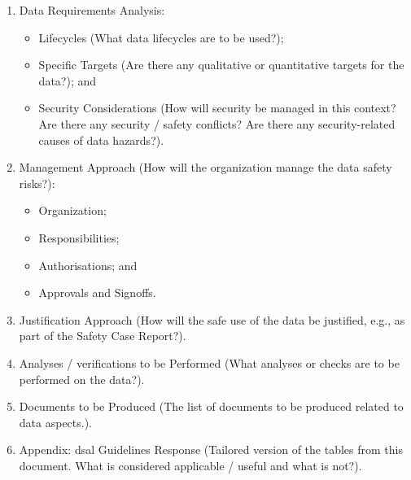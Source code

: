 \begin{enumerate}
  \item Data Requirements Analysis:
  \begin{itemize}
    \item Lifecycles (What data lifecycles are to be used?);
    \item Specific Targets (Are there any qualitative or quantitative targets for the data?); and
    \item Security Considerations (How will security be managed in this context? Are there any security / safety conflicts? Are there any security-related causes of data \glspl{hazard}?).
  \end{itemize}
  \item Management Approach (How will the organization manage the data safety risks?):
  \begin{itemize}
    \item Organization;
    \item Responsibilities;
    \item Authorisations; and
    \item Approvals and Signoffs.
  \end{itemize}
  \item Justification Approach (How will the safe use of the data be justified, e.g., as part of the Safety Case Report?). 
  \item Analyses / \glspl{verification} to be Performed (What analyses or checks are to be performed on the data?).
  \item Documents to be Produced (The list of documents to be produced related to data aspects.).
  \item Appendix: \gls{dsal} Guidelines Response (Tailored version of the tables from this document. What is considered applicable / useful and what is not?).
\end{enumerate}
